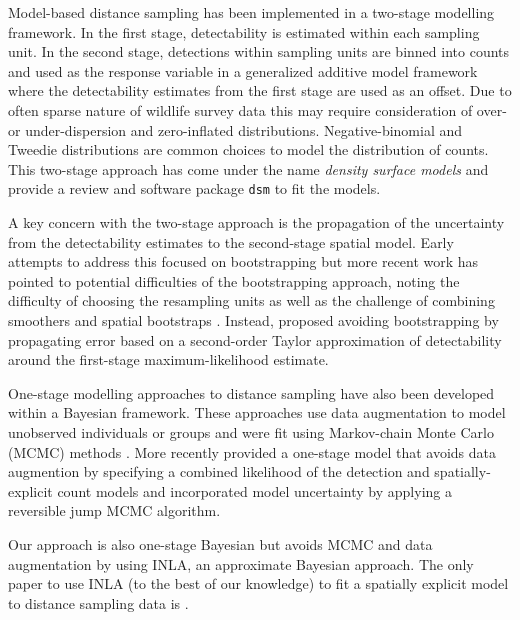 \documentclass[preprint,12pt]{elsarticle}
\begin{document}
Model-based distance sampling has been implemented in a two-stage modelling framework.  In the first stage, detectability is estimated within each sampling unit.  In the second stage, detections within sampling units are binned into counts and used as the response variable in a generalized additive model framework where the detectability estimates from the first stage are used as an offset.  Due to often sparse nature of wildlife survey data this may require consideration of over- or under-dispersion and zero-inflated distributions.  Negative-binomial and Tweedie distributions are common choices to model the distribution of counts.  This two-stage approach has come under the name \textit{density surface models} and \cite{miller_spatial_2013} provide a review and software package \texttt{dsm} to fit the models.  

A key concern with the two-stage approach is the propagation of the uncertainty from the detectability estimates to the second-stage spatial model.  Early attempts to address this focused on bootstrapping \citep{lahiri_resampling_2003, hedley_spatial_2004} but more recent work has pointed to potential difficulties of the bootstrapping approach, noting the difficulty of choosing the resampling units as well as the challenge of combining smoothers and spatial bootstraps \citep{bravington_reliable_2018-1}. Instead, \cite{bravington_reliable_2018-1}  proposed avoiding bootstrapping by propagating error based on a second-order Taylor approximation of detectability around the first-stage maximum-likelihood estimate.

One-stage modelling approaches to distance sampling have also been developed within a Bayesian framework.  These approaches use data augmentation to model unobserved individuals or groups and were fit using Markov-chain Monte Carlo (MCMC) methods \citep{royle_hierarchical_2008, schmidt_using_2012}.  More recently  \cite{oedekoven_bayesian_2014} provided a one-stage model that avoids data augmention by specifying a combined likelihood of the detection and spatially-explicit count models and incorporated model uncertainty by applying a reversible jump MCMC algorithm.

Our approach is also one-stage Bayesian but avoids MCMC and data augmentation by using INLA, an approximate Bayesian approach.  The only paper to use INLA (to the best of our knowledge) to fit a spatially explicit model to distance sampling data is \citet{yuan_point_2017}.  

\end{document}
